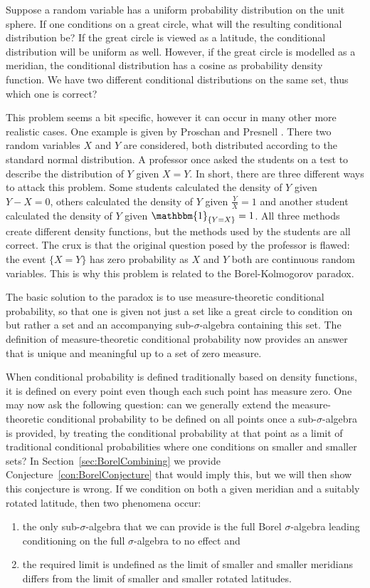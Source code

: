 \documentclass[a4paper]{report}
\theoremstyle{plain}
\theoremstyle{definition}
\theoremstyle{remark}
\numberwithin{equation}{chapter}
\DeclareMathOperator{\1}{\mathbbm{1}}
\begin{document}
Suppose a random variable has a uniform probability distribution on the unit sphere. If one conditions on a great circle, what will the resulting conditional distribution be? If the great circle is viewed as a latitude, the conditional distribution will be uniform as well. However, if the great circle is modelled as a meridian, the conditional distribution has a cosine as probability density function. We have two different conditional distributions on the same set, thus which one is correct?

This problem seems a bit specific, however it can occur in many other more realistic cases. One example is given by Proschan and Presnell \cite{Proschan98}. There two random variables $X$ and $Y$ are considered, both distributed according to the standard normal distribution. A professor once asked the students on a test to describe the distribution of $Y$ given $X=Y$. In short, there are three different ways to attack this problem. Some students calculated the density of $Y$ given $Y-X=0$, others calculated the density of $Y$ given $\frac{Y}{X}=1$ and another student calculated the density of $Y$ given $\1_{\{Y=X\}}=1$. All three methods create different density functions, but the methods used by the students are all correct. The crux is that the original question posed by the professor is flawed: the event $\{X=Y\}$ has zero probability as $X$ and $Y$ both are continuous random variables. This is why this problem is related to the Borel-Kolmogorov paradox.

The basic solution to the paradox is to use measure-theoretic conditional probability, so that one is given not just a set like a great circle to condition on but rather a set and an accompanying sub-$\sigma$-algebra containing this set. The definition of measure-theoretic conditional probability now provides an answer that is unique and meaningful up to a set of zero measure. 

When conditional probability is defined traditionally based on density functions, it is defined on every point even though each such point has measure zero. One may now ask the following question: can we generally extend the measure-theoretic conditional probability to be defined on all points once a sub-$\sigma$-algebra is provided, by treating the conditional probability at that point as a limit of traditional conditional probabilities where one conditions on smaller and smaller sets? In Section~\ref{sec:BorelCombining} we provide Conjecture~\ref{con:BorelConjecture} that would imply this, but we will then show this conjecture is wrong. If we condition on both a given meridian and a suitably rotated latitude, then two phenomena occur:
\begin{enumerate}
\item the only sub-$\sigma$-algebra that we can provide is the full Borel $\sigma$-algebra leading conditioning on the full $\sigma$-algebra to no effect and
\item the required limit is undefined as the limit of smaller and smaller meridians differs from the limit of smaller and smaller rotated latitudes.
\end{enumerate}
\end{document}
